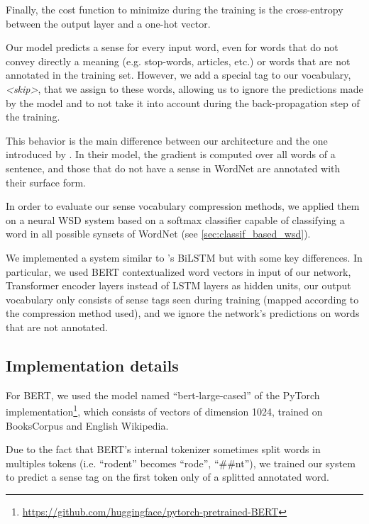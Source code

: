 \documentclass[11pt]{article}
\newcommand{\citep}[1]{\cite{#1}}
\newcommand{\citet}[1]{\newcite{#1}}
\begin{document}
Finally, the cost function to minimize during the training is the cross-entropy between the output layer and a one-hot vector.

Our model predicts a sense for every input word, even for words that do not convey directly a meaning (e.g. stop-words, articles, etc.) or words that are not annotated in the training set. However, we add a special tag to our vocabulary, \textit{<skip>}, that we assign to these words, allowing us to ignore the predictions made by the model and to not take it into account during the back-propagation step of the training. 

This behavior is the main difference between our architecture and the one introduced by \cite{raganato2017}. In their model, the gradient is computed over all words of a sentence, and those that do not have a sense in WordNet are annotated with their surface form.

\fi

In order to evaluate our sense vocabulary compression methods, we applied them on a neural WSD system 
based on a softmax classifier capable of classifying a word in all possible synsets of WordNet (see \autoref{sec:classif_based_wsd}).

We implemented a system 
similar to \citet{raganato2017}'s BiLSTM but with some key differences. In particular, 
we used BERT contextualized word vectors \citep{devlin2018bert} in input of our network,
Transformer encoder 
layers 
\citep{vaswani2017} instead of LSTM 
layers 
as hidden units, 
our output vocabulary only consists of sense tags seen during training (mapped according to the compression method used), 
and we ignore the network's predictions on words that are not annotated.



\subsection{Implementation details}

For BERT, we used the model named ``bert-large-cased'' of the PyTorch implementation\footnote{\url{https://github.com/huggingface/pytorch-pretrained-BERT}}, which consists of vectors of dimension 1024, trained on BooksCorpus and English Wikipedia.

Due to the fact that BERT's internal tokenizer sometimes split words in multiples tokens (i.e. \lbrack{}``rodent''\rbrack{} becomes \lbrack{}``rode'', ``\#\#nt''\rbrack{}), we trained our system to predict a sense tag on the first token only of a splitted annotated word.
\end{document}
